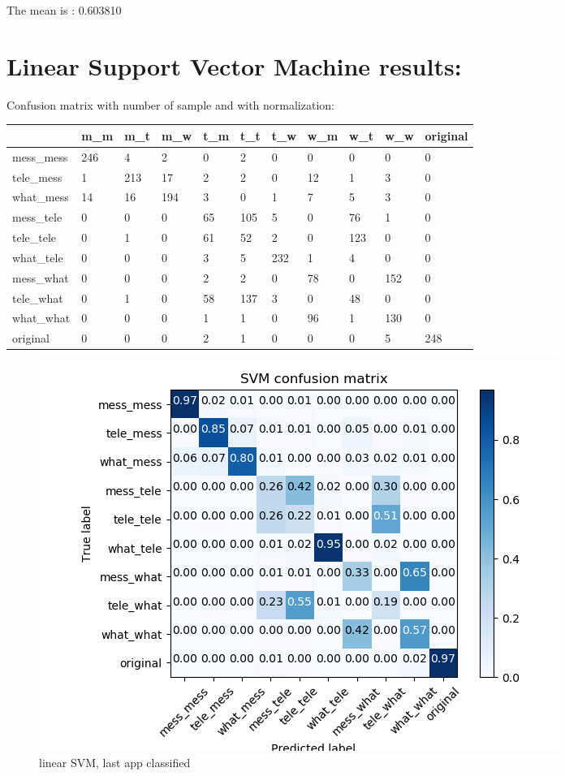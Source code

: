 The mean is : 0.603810\section{Linear Support Vector Machine results:} 
Confusion matrix with number of sample and with normalization:
 {\def\arraystretch{1.3} 
 \begin{table}[H] 
\centering 
\begin{tabular}{|l|l|l|l|l|l|l|l|l|l|l|} 
\hline 
  &m\_m  &m\_t  &m\_w  &t\_m  &t\_t  &t\_w  &w\_m  &w\_t  &w\_w  &original  \\ \hline
mess\_mess  &246  &4  &2  &0  &2  &0  &0  &0  &0  &0  \\ \hline
tele\_mess  &1  &213  &17  &2  &2  &0  &12  &1  &3  &0  \\ \hline
what\_mess  &14  &16  &194  &3  &0  &1  &7  &5  &3  &0  \\ \hline
mess\_tele  &0  &0  &0  &65  &105  &5  &0  &76  &1  &0  \\ \hline
tele\_tele  &0  &1  &0  &61  &52  &2  &0  &123  &0  &0  \\ \hline
what\_tele  &0  &0  &0  &3  &5  &232  &1  &4  &0  &0  \\ \hline
mess\_what  &0  &0  &0  &2  &2  &0  &78  &0  &152  &0  \\ \hline
tele\_what  &0  &1  &0  &58  &137  &3  &0  &48  &0  &0  \\ \hline
what\_what  &0  &0  &0  &1  &1  &0  &96  &1  &130  &0  \\ \hline
original  &0  &0  &0  &2  &1  &0  &0  &0  &5  &248  \\ \hline
\end{tabular} 
\end{table} }

 \begin{figure}[H] 
\centering 
\includegraphics[scale=.6]{images/new_met_lsvm_initial_double_complete.png} 
\caption{linear SVM, last app classified} 
\end{figure} 


